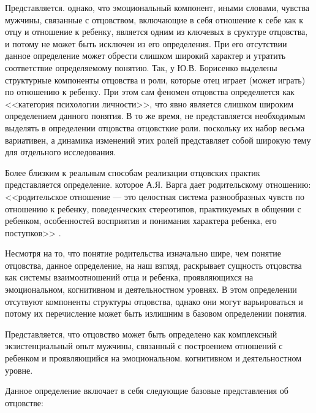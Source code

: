 \documentclass{../../common/thesisbyxetex}
\begin{document}
Представляется. однако, что эмоциональный компонент, иными словами, чувства мужчины, связанные с
отцовством, включающие в себя отношение к себе как к отцу и отношение к ребенку, является одним из
ключевых в сруктуре отцовства, и потому не может быть исключен из его определения. При его
отсутствии данное определение может обрести слишком широкий характер и утратить соответствие
определяемому понятию. Так, у Ю.В. Борисенко выделены структурные компоненты отцовства и роли,
которые отец играет (может играть) по отношению к ребенку. При этом сам феномен отцовства
определяется как <<категория психологии
личности>>, что явно является слишком широким определением данного понятия. В то же время, не
представляется необходимым выделять в определении отцовства отцовсткие роли. поскольку их набор
весьма вариативен, а динамика изменений этих ролей представляет собой широкую тему для отдельного
исследования.

Более  близким к реальным способам реализации отцовских практик представляется определение. которое
А.Я. Варга дает родительскому отношению: <<родительское отношение --- это целостная система
разнообразных чувств по отношению к ребенку, поведенческих стереотипов, практикуемых в общении с
ребенком, особенностей восприятия и понимания характера ребенка, его поступков>> \cite[7]{varga}.

Несмотря на то, что понятие родительства изначально шире, чем понятие отцовства, данное
определение, на наш взгляд, раскрывает сущность отцовства как системы взаимоотношений отца и
ребенка, проявляющихся на эмоциональном, когнитивном и деятельностном уровнях.  В этом определении
отсутвуют компоненты структуры отцовства, однако они могут варьироваться и потому их перечисление
может быть излишним в базовом определении понятия.

Представляется, что отцовство может быть определено как комплексный экзистенциальный опыт мужчины,
связанный с построением отношений с ребенком и проявляющийся на эмоциональном.
когнитивном и деятельностном уровне.

Данное определение включает в себя следующие базовые представления об отцовстве:
\end{document}
